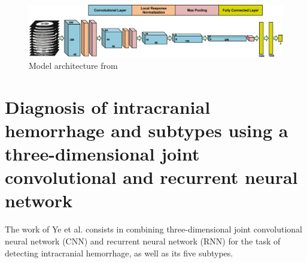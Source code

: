 \begin{figure}[h]
\begin{centering}
\includegraphics[width=16cm]{assets/images/RW1-net-arch.png}
\par\end{centering}
\caption{Model architecture from \cite{relatedWork1} \label{fig:rw1}}
\end{figure}


\section{Diagnosis of intracranial hemorrhage and subtypes using a three-dimensional joint convolutional and recurrent neural network}

The work of Ye et al. \cite{relatedWork2} consists in combining three-dimensional joint convolutional neural network (CNN) and recurrent neural network (RNN) for the task of detecting intracranial hemorrhage, as well as its five subtypes.
